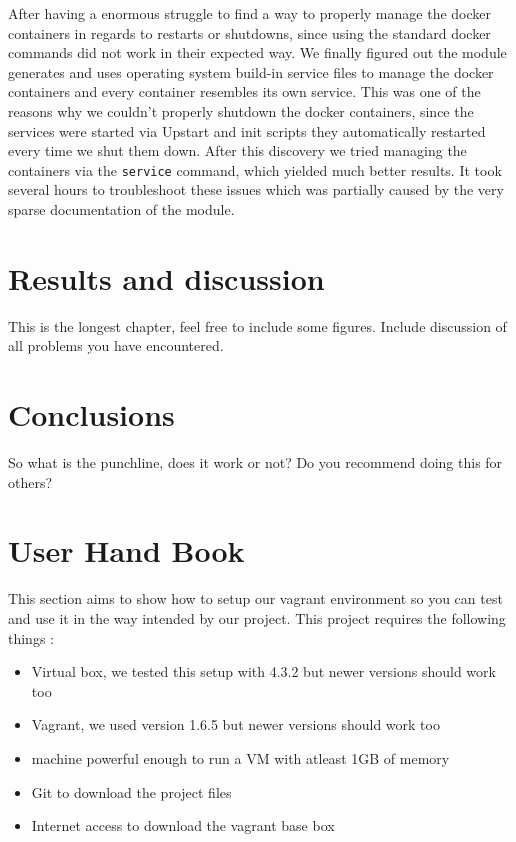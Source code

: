 After having a enormous struggle to find a way to properly manage the docker containers in regards to restarts or shutdowns, since using the standard docker commands did not work in their expected way. We finally figured out the module generates and uses operating system build-in service files to manage the docker containers and every container resembles its own service. This was one of the reasons why we couldn't properly shutdown the docker containers, since the services were started via Upstart and init scripts they automatically restarted every time we shut them down. After this discovery we tried managing the containers via the \verb|service| command, which yielded much better results. It took several hours to troubleshoot these issues which was partially caused by the very sparse documentation of the module.

\section{Results and discussion}

This is the longest chapter, feel free to include some figures. Include
discussion of all problems you have encountered.



\section{Conclusions}

So what is the punchline, does it work or not? Do you recommend doing this
for others?

\section{User Hand Book}
This section aims to show how to setup our vagrant environment so you can test and use it in the way intended by our project.
This project requires the following things :
\begin{itemize}
\item Virtual box, we tested this setup with 4.3.2 but newer versions should work too
\item Vagrant, we used version 1.6.5 but newer versions should work too
\item machine powerful enough to run a \gls{VM} with atleast 1GB of memory
\item Git to download the project files
\item Internet access to download the vagrant base \gls{box}
\end{itemize}

